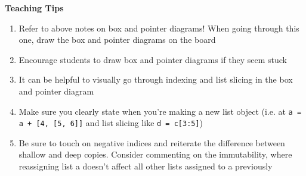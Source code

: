     \begin{blocksection}
        \begin{guide}
        \textbf{Teaching Tips}
        \begin{enumerate}
                \item Refer to above notes on box and pointer diagrams! When going through this one, draw the box and pointer diagrams on the board
                \item Encourage students to draw box and pointer diagrams if they seem stuck
                \item It can be helpful to visually go through indexing and list slicing in the box and pointer diagram
                \item Make sure you clearly state when you’re making a new list object (i.e. at \texttt{a = a + [4, [5, 6]]} and list slicing like \texttt{d = c[3:5]})
                \item Be sure to touch on negative indices and reiterate the difference between shallow and deep copies. Consider commenting on the immutability, where reassigning list a doesn't affect all other lists assigned to a previously
        \end{enumerate}
        \end{guide}
    \end{blocksection}